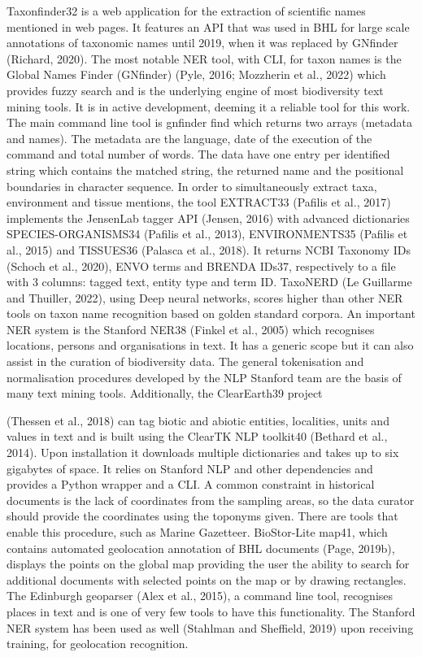 Taxonfinder32 is a web application for the extraction of scientific names mentioned in web pages. It features an API that was used in BHL for large scale annotations of taxonomic names until 2019, when it was replaced by GNfinder (Richard, 2020).
The most notable NER tool, with CLI, for taxon names is the Global Names Finder (GNfinder) (Pyle, 2016; Mozzherin et al., 2022) which provides fuzzy search and is the underlying engine of most biodiversity text mining tools. It is in active development, deeming it a reliable tool for this work. The main command line tool is gnfinder find which returns two arrays (metadata and names). The metadata are the language, date of the execution of the command and total number of words. The data have one entry per identified string which contains the matched string, the returned name and the positional boundaries in character sequence.
In order to simultaneously extract taxa, environment and tissue mentions, the tool EXTRACT33 (Pafilis et al., 2017) implements the JensenLab tagger API (Jensen, 2016) with advanced dictionaries SPECIES-ORGANISMS34 (Pafilis et al., 2013), ENVIRONMENTS35 (Pafilis et al., 2015) and TISSUES36 (Palasca et al., 2018). It returns NCBI Taxonomy IDs (Schoch et al., 2020), ENVO terms and BRENDA IDs37, respectively to a file with 3 columns: tagged text, entity type and term ID. TaxoNERD (Le Guillarme and Thuiller, 2022), using Deep neural networks, scores higher than other NER tools on taxon name recognition based on golden standard corpora.
An important NER system is the Stanford NER38 (Finkel et al., 2005) which recognises locations, persons and organisations in text. It has a generic scope but it can also assist in the curation of biodiversity data. The general tokenisation and normalisation procedures developed by the NLP Stanford team are the basis of many text mining tools. Additionally, the ClearEarth39 project

(Thessen et al., 2018) can tag biotic and abiotic entities, localities, units and values in text and is built using the ClearTK NLP toolkit40 (Bethard et al., 2014). Upon installation it downloads multiple dictionaries and takes up to six gigabytes of space. It relies on Stanford NLP and other dependencies and provides a Python wrapper and a CLI.
A common constraint in historical documents is the lack of coordinates from the sampling areas, so the data curator should provide the coordinates using the toponyms given. There are tools that enable this procedure, such as Marine Gazetteer. BioStor-Lite map41, which contains automated geolocation annotation of BHL documents (Page, 2019b), displays the points on the global map providing the user the ability to search for additional documents with selected points on the map or by drawing rectangles. The Edinburgh geoparser (Alex et al., 2015), a command line tool, recognises places in text and is one of very few tools to have this functionality. The Stanford NER system has been used as well (Stahlman and Sheffield, 2019) upon receiving training, for geolocation recognition.

